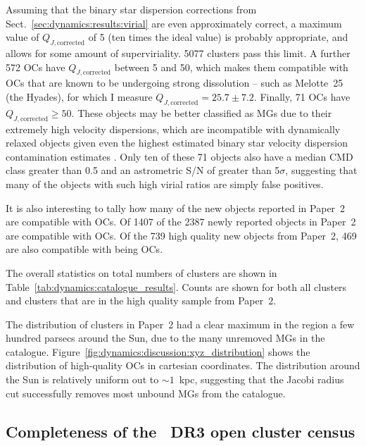 Assuming that the binary star dispersion corrections from Sect.~\ref{sec:dynamics:results:virial} are even approximately correct, a maximum value of $Q_{J,\text{corrected}}$ of 5 (ten times the ideal value) is probably appropriate, and allows for some amount of superviriality. 5077 clusters pass this limit. A further 572 OCs have $Q_{J,\text{corrected}}$ between 5 and 50, which makes them compatible with OCs that are known to be undergoing strong dissolution -- such as Melotte~25 (the Hyades), for which I measure $Q_{J,\text{corrected}}=25.7 \pm 7.2$. Finally, 71 OCs have $Q_{J,\text{corrected}}\geq50$. These objects may be better classified as MGs due to their extremely high velocity dispersions, which are incompatible with dynamically relaxed objects given even the highest estimated binary star velocity dispersion contamination estimates \citep{rastello_effect_binarity_2020}. Only ten of these 71 objects also have a median CMD class greater than 0.5 and an astrometric S/N of greater than 5$\sigma$, suggesting that many of the objects with such high virial ratios are simply false positives.

It is also interesting to tally how many of the new objects reported in Paper~2 are compatible with OCs. Of 1407 of the 2387 newly reported objects in Paper~2 are compatible with OCs. Of the 739 high quality new objects from Paper~2, 469 are also compatible with being OCs.

The overall statistics on total numbers of clusters are shown in Table~\ref{tab:dynamics:catalogue_results}. Counts are shown for both all clusters and clusters that are in the high quality sample from Paper~2.

The distribution of clusters in Paper~2 had a clear maximum in the region a few hundred parsecs around the Sun, due to the many unremoved MGs in the catalogue. Figure~\ref{fig:dynamics:discussion:xyz_distribution} shows the distribution of high-quality OCs in cartesian coordinates. The distribution around the Sun is relatively uniform out to $\sim1$~kpc, suggesting that the Jacobi radius cut successfully removes most unbound MGs from the catalogue.


\subsection{Completeness of the \gaia\ DR3 open cluster census}
\label{sec:dynamics:results:completeness}

